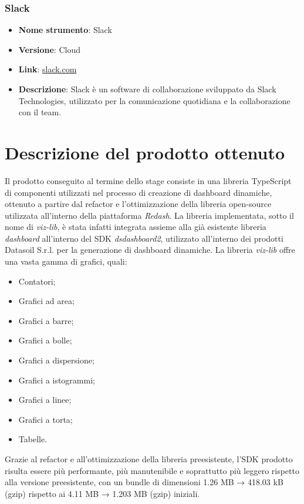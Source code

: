 \subsubsection{Slack}
\begin{itemize}
      \item \textbf{Nome strumento}: Slack
      \item \textbf{Versione}: Cloud
      \item \textbf{Link}: \href{https://slack.com/}{slack.com}
      \item \textbf{Descrizione}: Slack è un software di collaborazione sviluppato da Slack Technologies, utilizzato per la comunicazione quotidiana e la collaborazione
            con il team.
\end{itemize}

\section{Descrizione del prodotto ottenuto}
Il prodotto conseguito al termine dello stage consiste in una libreria TypeScript di componenti utilizzati nel processo di creazione di dashboard dinamiche,
ottenuto a partire dal refactor e l'ottimizzazione della libreria open-source utilizzata all'interno della piattaforma \textit{Redash}.
La libreria implementata, sotto il nome di \textit{viz-lib}, è stata infatti integrata assieme alla già esistente libreria \textit{dashboard} all'interno del SDK
\textit{dsdashboard2}, utilizzato all'interno dei prodotti Datasoil S.r.l. per la generazione di dashboard dinamiche.
La libreria \textit{viz-lib} offre una vasta gamma di grafici, quali:
\begin{itemize}
      \item Contatori;
      \item Grafici ad area;
      \item Grafici a barre;
      \item Grafici a bolle;
      \item Grafici a dispersione;
      \item Grafici a istogrammi;
      \item Grafici a linee;
      \item Grafici a torta;
      \item Tabelle.
\end{itemize}
Grazie al refactor e all'ottimizzazione della libreria preesistente, l'SDK prodotto risulta essere più performante, più manutenibile e soprattutto più leggero rispetto
alla versione preesistente, con un bundle di dimensioni 1.26 MB → 418.03 kB (gzip) rispetto ai 4.11 MB → 1.203 MB (gzip) iniziali.


